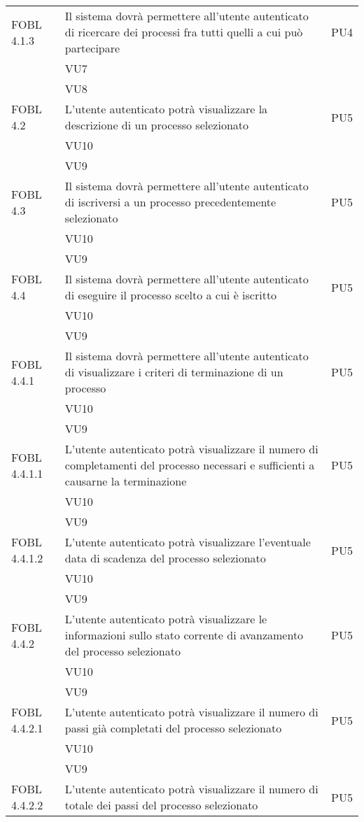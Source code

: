 \begin{longtable}{lXp{}}
\midrule 
FOBL 4.1.3&Il sistema dovrà permettere all'utente autenticato di ricercare dei processi fra tutti quelli a cui può partecipare&PU4\\ 
&VU7\\ 
&VU8\\ 
\midrule 
FOBL 4.2&L'utente autenticato potrà visualizzare la descrizione di un processo selezionato&PU5\\ 
&VU10\\ 
&VU9\\ 
\midrule 
FOBL 4.3&Il sistema dovrà permettere all'utente autenticato di iscriversi a un processo precedentemente selezionato&PU5\\ 
&VU10\\ 
&VU9\\ 
\midrule 
FOBL 4.4&Il sistema dovrà permettere all'utente autenticato di eseguire il processo scelto a cui è iscritto&PU5\\ 
&VU10\\ 
&VU9\\ 
\midrule 
FOBL 4.4.1&Il sistema dovrà permettere all'utente autenticato di visualizzare i criteri di terminazione di un processo&PU5\\ 
&VU10\\ 
&VU9\\ 
\midrule 
FOBL 4.4.1.1&L'utente autenticato potrà visualizzare il numero di completamenti del processo necessari e sufficienti a causarne la terminazione&PU5\\ 
&VU10\\ 
&VU9\\ 
\midrule 
FOBL 4.4.1.2&L'utente autenticato potrà visualizzare l'eventuale data di scadenza del processo selezionato&PU5\\ 
&VU10\\ 
&VU9\\ 
\midrule 
FOBL 4.4.2&L'utente autenticato potrà visualizzare le informazioni sullo stato corrente di avanzamento del processo selezionato&PU5\\ 
&VU10\\ 
&VU9\\ 
\midrule 
FOBL 4.4.2.1&L'utente autenticato potrà visualizzare il numero di passi già completati del processo selezionato&PU5\\
&VU10\\ 
&VU9\\ 
\midrule 
FOBL 4.4.2.2&L'utente autenticato potrà visualizzare il numero di totale dei passi del processo selezionato&PU5\\ 

\end{longtable}
